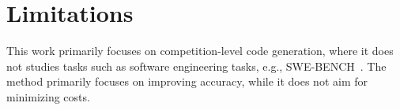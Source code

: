 \section{Limitations}
This work primarily focuses on competition-level code generation, where it does not studies tasks such as software engineering tasks, e.g., SWE-BENCH~\citep{jimenez2023swe}. The method primarily focuses on improving accuracy, while it does not aim for minimizing costs.